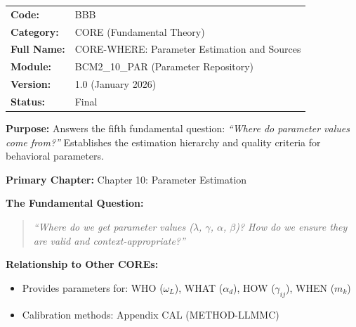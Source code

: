 %
%
%

\begin{tcolorbox}[colback=gray!5!white, colframe=gray!75!black,
    title=Appendix Header: BBB CORE-WHERE]

\begin{tabular}{@{}ll@{}}
\textbf{Code:} & BBB \\
\textbf{Category:} & CORE (Fundamental Theory) \\
\textbf{Full Name:} & CORE-WHERE: Parameter Estimation and Sources \\
\textbf{Module:} & BCM2\_10\_PAR (Parameter Repository) \\
\textbf{Version:} & 1.0 (January 2026) \\
\textbf{Status:} & Final \\
\end{tabular}

\vspace{0.5em}
\textbf{Purpose:} Answers the fifth fundamental question:
\textit{``Where do parameter values come from?''}
Establishes the estimation hierarchy and quality criteria for behavioral parameters.

\end{tcolorbox}

\begin{tcolorbox}[colback=purple!5!white, colframe=purple!75!black,
    title=Chapter Linkage]

\textbf{Primary Chapter:} Chapter 10: Parameter Estimation

\textbf{The Fundamental Question:}
\begin{quote}
\textit{``Where do we get parameter values ($\lambda$, $\gamma$, $\alpha$, $\beta$)?
How do we ensure they are valid and context-appropriate?''}
\end{quote}

\textbf{Relationship to Other COREs:}
\begin{itemize}[nosep]
\item Provides parameters for: WHO ($\omega_L$), WHAT ($\alpha_d$), HOW ($\gamma_{ij}$), WHEN ($m_k$)
\item Calibration methods: Appendix CAL (METHOD-LLMMC)
\end{itemize}

\end{tcolorbox}

